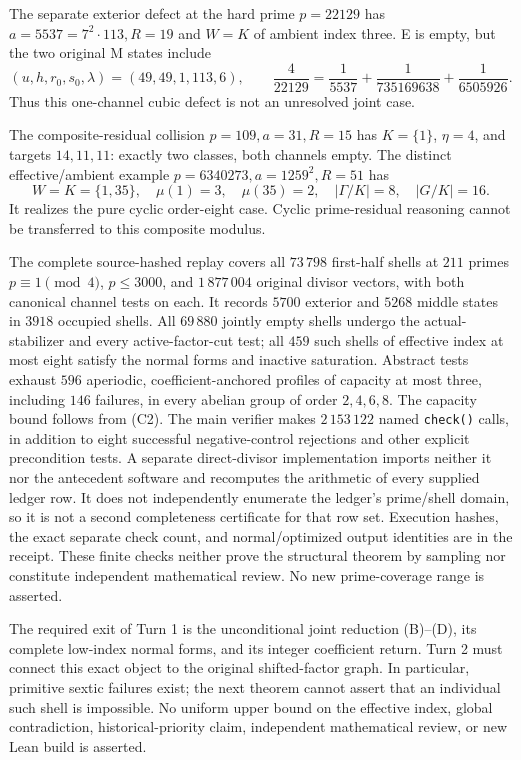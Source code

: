 The separate exterior defect at the hard prime $p=22129$ has
$a=5537=7^2\cdot113,R=19$ and $W=K$ of ambient index three. E is empty,
but the two original M states include
\[
 (u,h,r_0,s_0,\lambda)=(49,49,1,113,6),\qquad
 \frac4{22129}=\frac1{5537}+\frac1{735169638}+\frac1{6505926}.
\]
Thus this one-channel cubic defect is not an unresolved joint case.

The composite-residual collision $p=109,a=31,R=15$ has $K=\{1\}$,
$\eta=4$, and targets $14,11,11$: exactly two classes, both channels empty.
The distinct effective/ambient example $p=6340273,a=1259^2,R=51$ has
\[
 W=K=\{1,35\},\quad \mu(1)=3,\quad\mu(35)=2,
 \quad |\Gamma/K|=8,\quad |G/K|=16.
\]
It realizes the pure cyclic order-eight case. Cyclic prime-residual reasoning
cannot be transferred to this composite modulus.

The complete source-hashed replay covers all $73\,798$ first-half shells at
$211$ primes $p\equiv1\pmod4$, $p\le3000$, and $1\,877\,004$ original divisor
vectors, with both canonical channel tests on each. It records $5700$ exterior
and $5268$ middle states in $3918$ occupied shells. All $69\,880$ jointly
empty shells undergo the actual-stabilizer and every active-factor-cut test;
all $459$ such shells of effective index at most eight satisfy the normal forms
and inactive saturation. Abstract tests exhaust $596$ aperiodic,
coefficient-anchored profiles of capacity at most three, including $146$
failures, in every abelian group of order $2,4,6,8$. The capacity bound follows
from (C2). The main verifier makes $2\,153\,122$ named \texttt{check()} calls,
in addition to eight successful negative-control rejections and other explicit
precondition tests. A separate direct-divisor implementation imports neither
it nor the antecedent software and recomputes the arithmetic of every supplied
ledger row. It does not independently enumerate the ledger's prime/shell
domain, so it is not a second completeness certificate for that row set.
Execution hashes, the exact separate check count, and normal/optimized output
identities are in the receipt. These finite checks neither prove the structural
theorem by sampling nor constitute independent mathematical review. No new
prime-coverage range is asserted.

The required exit of Turn 1 is the unconditional joint reduction (B)--(D),
its complete low-index normal forms, and its integer coefficient return.
Turn 2 must connect this exact object to the original shifted-factor graph.
In particular, primitive sextic failures exist; the next theorem cannot
assert that an individual such shell is impossible. No uniform upper bound
on the effective index, global contradiction, historical-priority claim,
independent mathematical review, or new Lean build is asserted.
